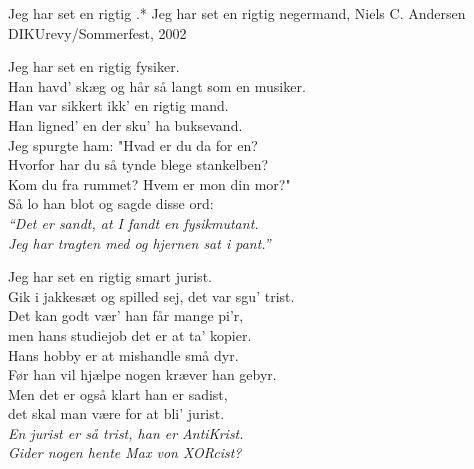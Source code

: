 \begin{song}{Jeg har set en rigtig .*}
  {} %
  {Jeg har set en rigtig negermand, Niels C. Andersen} %
  {} %
  {DIKUrevy/Sommerfest, 2002} %
  {\NotCCLIed} %

  \begin{SBVerse}
    Jeg har set en rigtig fysiker.\\
    Han havd’ skæg og hår så langt som en musiker.\\
    Han var sikkert ikk’ en rigtig mand.\\
    Han ligned’ en der sku’ ha buksevand.\\\medskip
    Jeg spurgte ham: "Hvad er du da for en?\\
    Hvorfor har du så tynde blege stankelben?\\
    Kom du fra rummet? Hvem er mon din mor?"\\
    Så lo han blot og sagde disse ord:\\\medskip
    \emph{``Det er sandt, at I fandt en fysikmutant.\\
    Jeg har tragten med og hjernen sat i pant.''}
  \end{SBVerse}

  \begin{SBVerse}
    Jeg har set en rigtig smart jurist.\\
    Gik i jakkesæt og spilled sej, det var sgu’ trist.\\
    Det kan godt vær’ han får mange pi’r,\\
    men hans studiejob det er at ta’ kopier.\\\medskip
    Hans hobby er at mishandle små dyr.\\
    Før han vil hjælpe nogen kræver han gebyr.\\
    Men det er også klart han er sadist,\\
    det skal man være for at bli’ jurist.\\\medskip
    \emph{En jurist er så trist, han er AntiKrist.\\
    Gider nogen hente Max von XORcist?}
  \end{SBVerse}


\end{song}
